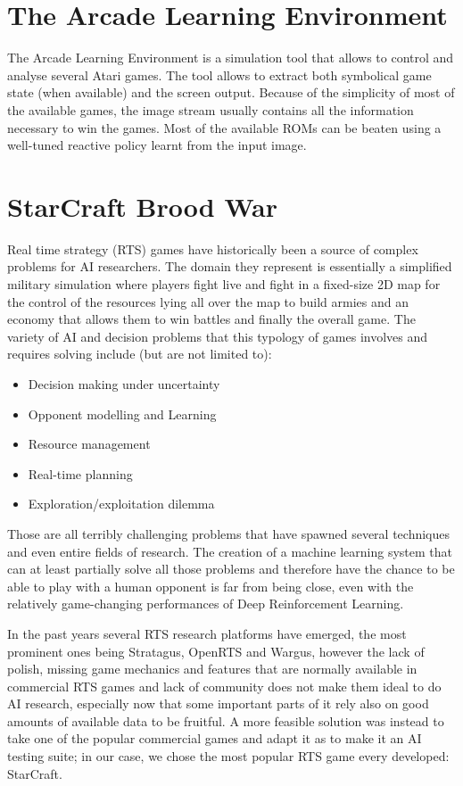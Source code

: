 \documentclass[bsc,frontabs,twoside,singlespacing,parskip,deptreport]{infthesis}     %
\begin{document}
\section{The Arcade Learning Environment}
The Arcade Learning Environment is a simulation tool that allows to control and
analyse several Atari games. The tool allows to extract both symbolical game
state (when available) and the screen output. Because of the simplicity of most
of the available games, the image stream usually contains all the information
necessary to win the games. Most of the available ROMs can be beaten using a
well-tuned reactive policy learnt from the input image\cite{mnih2015human}.

\section{StarCraft Brood War}
Real time strategy (RTS) games have historically been a source of complex
problems for AI researchers. The domain they represent is essentially a
simplified military simulation where players fight live and fight in a
fixed-size 2D map for the control of the resources lying all over the map to
build armies and an economy that allows them to win battles and finally the
overall game. The variety of AI and decision problems that this typology of
games involves and requires solving include (but are not limited to):

\begin{itemize}
  \item Decision making under uncertainty
  \item Opponent modelling and Learning
  \item Resource management
  \item Real-time planning
  \item Exploration/exploitation dilemma
\end{itemize}

Those are all terribly challenging problems that have spawned several techniques
and even entire fields of research\cite{buro2003real}. The creation of a machine
learning system that can at least partially solve all those problems and
therefore have the chance to be able to play with a human opponent is far from
being close, even with the relatively game-changing performances of Deep
Reinforcement Learning.

In the past years several RTS research platforms have emerged, the most
prominent ones being Stratagus, OpenRTS and Wargus, however the lack of polish,
missing game mechanics and features that are normally available in commercial
RTS games and lack of community does not make them ideal to do AI research,
especially now that some important parts of it rely also on good amounts of
available data to be fruitful. A more feasible solution was instead to take one
of the popular commercial games and adapt it as to make it an AI testing suite;
in our case, we chose the most popular RTS game every developed: StarCraft.
\end{document}
